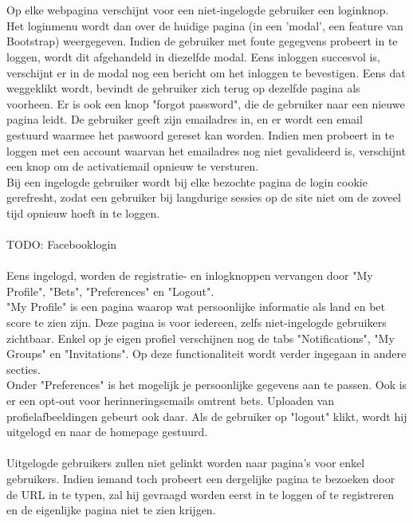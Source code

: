 \documentclass[11pt, a4paper]{article}
\begin{document}
\\
\\
Op elke webpagina verschijnt voor een niet-ingelogde gebruiker een loginknop. Het loginmenu wordt dan over de huidige pagina (in een 'modal', een feature van Bootstrap) weergegeven. Indien de gebruiker met foute gegegvens probeert in te loggen, wordt dit afgehandeld in diezelfde modal. Eens inloggen succesvol is, verschijnt er in de modal nog een bericht om het inloggen te bevestigen. Eens dat weggeklikt wordt, bevindt de gebruiker zich terug op dezelfde pagina als voorheen. Er is ook een knop "forgot password", die de gebruiker naar een nieuwe pagina leidt. De gebruiker geeft zijn emailadres in, en er wordt een email gestuurd waarmee het paswoord gereset kan worden. Indien men probeert in te loggen met een account waarvan het emailadres nog niet gevalideerd is, verschijnt een knop om de activatiemail opnieuw te versturen. \\ Bij een ingelogde gebruiker wordt bij elke bezochte pagina de login cookie gerefresht, zodat een gebruiker bij langdurige sessies op de site niet om de zoveel tijd opnieuw hoeft in te loggen. \\ \\

TODO: Facebooklogin \\ \\

Eens ingelogd, worden de registratie- en inlogknoppen vervangen door "My Profile", "Bets", "Preferences" en "Logout". \\
"My Profile" is een pagina waarop wat persoonlijke informatie als land en bet score te zien zijn. Deze pagina is voor iedereen, zelfs niet-ingelogde gebruikers zichtbaar. Enkel op je eigen profiel verschijnen nog de tabs "Notifications", "My Groups" en "Invitations". Op deze functionaliteit wordt verder ingegaan in andere secties. \\
Onder "Preferences" is het mogelijk je persoonlijke gegevens aan te passen.	Ook is er een opt-out voor herinneringsemails omtrent bets. Uploaden van profielafbeeldingen gebeurt ook daar.
Als de gebruiker op "logout" klikt, wordt hij uitgelogd en naar de homepage gestuurd. \\ \\

Uitgelogde gebruikers zullen niet gelinkt worden naar pagina's voor enkel gebruikers. Indien iemand toch probeert een dergelijke pagina te bezoeken door de URL in te typen, zal hij gevraagd worden eerst in te loggen of te registreren en de eigenlijke pagina niet te zien krijgen. \\ \\
\end{document}
